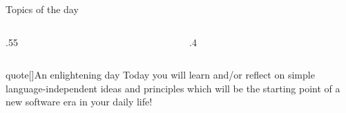 
\PrepareURLsymbol[PB]
\begin{frame}
    \titlepage
\end{frame}
\begin{frame}[label=toc,plain,noframenumbering]{Topics of the day}
    \begin{columns}
        \hfill
        \begin{column}{.55\textwidth}
            \hspace*{4mm}
            \begin{minipage}[0.5\textheight]{\textwidth}
                \tableofcontents[sections={1}]
                \vspace{1.5mm}
                \tableofcontents[sections={2}, hideallsubsections]
            \end{minipage}
        \end{column}
        \hfill
        \begin{column}{.4\textwidth}
            \begin{minipage}[0.5\textheight]{\textwidth}
                \tableofcontents[sections={3-}, hideallsubsections]
            \end{minipage}
        \end{column}
        \hfill
    \end{columns}
    \vspace{2mm}
    \begin{varblock}{quote}[\textwidth]{An enlightening day}
        \normalfont\small
        Today you will learn and/or reflect on simple language-independent ideas and principles which will be the starting point of a new software era in your daily life!
    \end{varblock}
\end{frame}
